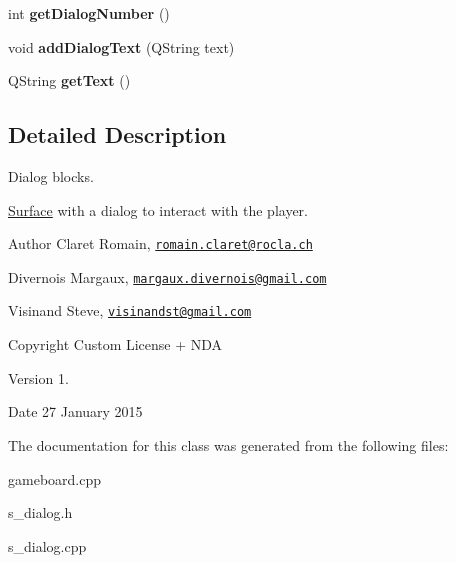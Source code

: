 \begin{DoxyCompactItemize}
\item 
\hypertarget{class_s___dialog_ad26a628ae1d62d07e1b226126b04814f}{}int {\bfseries get\+Dialog\+Number} ()\label{class_s___dialog_ad26a628ae1d62d07e1b226126b04814f}

\item 
\hypertarget{class_s___dialog_ac156dc3bb16b5c84bce3c710dae215f7}{}void {\bfseries add\+Dialog\+Text} (Q\+String text)\label{class_s___dialog_ac156dc3bb16b5c84bce3c710dae215f7}

\item 
\hypertarget{class_s___dialog_aac6c0556054892ff474f485b962027fd}{}Q\+String {\bfseries get\+Text} ()\label{class_s___dialog_aac6c0556054892ff474f485b962027fd}

\end{DoxyCompactItemize}


\subsection{Detailed Description}
Dialog blocks. 

\hyperlink{class_surface}{Surface} with a dialog to interact with the player. \begin{DoxyAuthor}{Author}
Claret Romain, \href{mailto:romain.claret@rocla.ch}{\tt romain.\+claret@rocla.\+ch} 

Divernois Margaux, \href{mailto:margaux.divernois@gmail.com}{\tt margaux.\+divernois@gmail.\+com} 

Visinand Steve, \href{mailto:visinandst@gmail.com}{\tt visinandst@gmail.\+com} 
\end{DoxyAuthor}
\begin{DoxyCopyright}{Copyright}
Custom License + N\+D\+A 
\end{DoxyCopyright}
\begin{DoxyVersion}{Version}
1. 
\end{DoxyVersion}
\begin{DoxyDate}{Date}
27 January 2015 
\end{DoxyDate}


The documentation for this class was generated from the following files\+:\begin{DoxyCompactItemize}
\item 
gameboard.\+cpp\item 
s\+\_\+dialog.\+h\item 
s\+\_\+dialog.\+cpp\end{DoxyCompactItemize}
